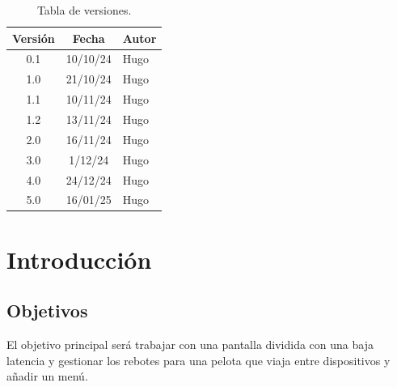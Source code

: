 \documentclass[a4paper,openright,12pt]{article}
\begin{document}
\newpage



\tableofcontents

\vspace{5cm}

\begin{flushright}
\begin{table}[hbtp]
\begin{center}

\caption{Tabla de versiones.}
\label{tabla:versiones}
\small
\vspace{1ex}

\begin{tabular}{|c|c|l|}
\hline
Versión & Fecha & Autor \\
\hline \hline
0.1 & 10/10/24 & Hugo\\ \hline
1.0 & 21/10/24 & Hugo\\ \hline
1.1 & 10/11/24 & Hugo\\ \hline
1.2 & 13/11/24 & Hugo\\ \hline
2.0 & 16/11/24 & Hugo\\ \hline
3.0 &  1/12/24 & Hugo\\ \hline
4.0 & 24/12/24 & Hugo\\ \hline
5.0 & 16/01/25 & Hugo\\ \hline

\end{tabular}

\end{center}
\end{table}
\end{flushright}

\newpage
{}


\section{Introducción}\label{cap.introduccion}

\subsection{Objetivos}
El objetivo principal será trabajar con una pantalla dividida con una baja latencia y gestionar los rebotes para una pelota que viaja entre dispositivos y añadir un menú.
\end{document}
